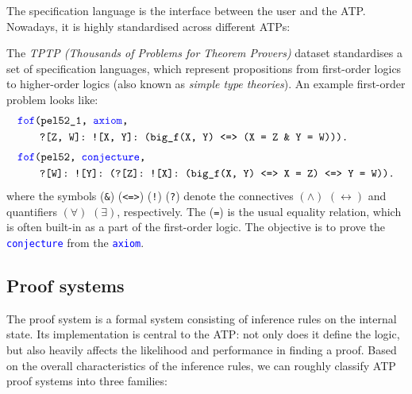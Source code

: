 \documentclass[twoside]{report}
\begin{document}
The specification language is the interface between the user and the ATP. Nowadays, it is highly standardised across different ATPs:

\begin{example}
    The \emph{TPTP (Thousands of Problems for Theorem Provers)} \cite{sutcliffe2017tptp} dataset standardises a set of specification languages, which represent propositions from first-order logics to higher-order logics (also known as \emph{simple type theories}). An example first-order problem looks like:
    $$
        \begin{aligned}
             & \texttt{\textcolor{blue}{fof}(pel52\_1, \textcolor{blue}{axiom},}              \\
             & \qquad \texttt{?[Z, W]: ![X, Y]: (big\_f(X, Y) <=> (X = Z \& Y = W))).}        \\[0.3em]
             & \texttt{\textcolor{blue}{fof}(pel52, \textcolor{blue}{conjecture},}            \\
             & \qquad \texttt{?[W]: ![Y]: (?[Z]: ![X]: (big\_f(X, Y) <=> X = Z) <=> Y = W)).}
        \end{aligned}
    $$
    where the symbols (\texttt{\&}) (\texttt{<=>}) (\texttt{!}) (\texttt{?}) denote the connectives $(\land)$ $(\leftrightarrow)$ and quantifiers $(\forall)$ $(\exists)$, respectively. The (\texttt{=}) is the usual equality relation, which is often built-in as a part of the first-order logic. The objective is to prove the \texttt{\textcolor{blue}{conjecture}} from the \texttt{\textcolor{blue}{axiom}}.
\end{example}

\subsection*{Proof systems}

The proof system is a formal system consisting of inference rules on the internal state. Its implementation is central to the ATP: not only does it define the logic, but also heavily affects the likelihood and performance in finding a proof. Based on the overall characteristics of the inference rules, we can roughly classify ATP proof systems into three families:
\end{document}
